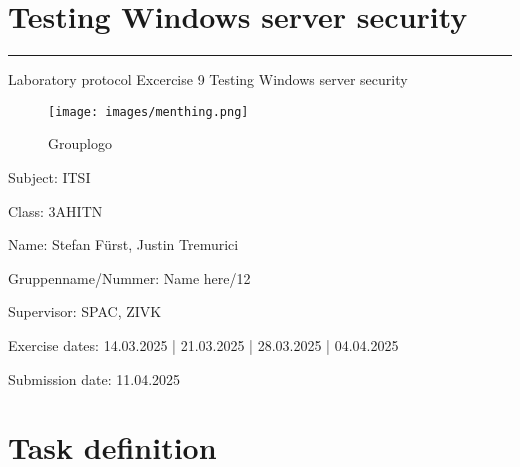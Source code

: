 \documentclass[a4paper]{article}
\begin{document}

\pagestyle{oida}
\section*{Testing Windows server security}
\par\noindent\rule{\textwidth}{0.4pt}

Laboratory protocol
Excercise 9 Testing Windows server security

\begin{figure}[h]
	\texttt{[image: images/menthing.png]}
	\centering
	\caption{Grouplogo}
\end{figure}

\vspace*{\fill}
Subject:	ITSI

Class:	3AHITN

Name:	Stefan Fürst, Justin Tremurici

Gruppenname/Nummer: Name here/12

Supervisor: 	SPAC, ZIVK

Exercise dates:	14.03.2025 | 21.03.2025 | 28.03.2025 | 04.04.2025

Submission date: 11.04.2025


\newpage
\tableofcontents

\newpage

\section{Task definition}
\end{document}
